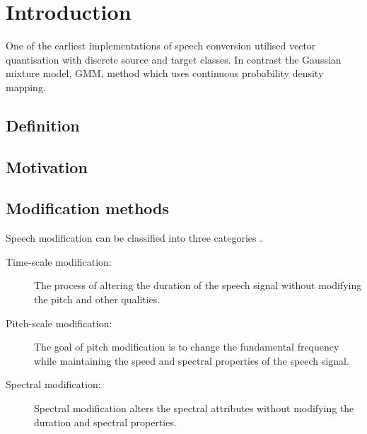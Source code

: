 \chapter{Introduction} %
\label{cha:introduction}
One of the earliest implementations of speech conversion utilised vector quantisation \cite{abe88} with discrete source and target classes. In contrast the Gaussian mixture model, GMM, method \cite{stylianou98} which uses continuous probability density mapping.

\section{Definition} %
\label{sec:definition}


\section{Motivation} %
\label{sec:motivation}


\section{Modification methods} %
\label{sec:synthesis_methods}
Speech modification can be classified into three categories \cite{nguyen09}.
\begin{description}
	\item[Time-scale modification: ] The process of altering the duration of the speech signal without modifying the pitch and other qualities.
	\item[Pitch-scale modification: ] The goal of pitch modification is to change the fundamental frequency while maintaining the speed and spectral properties of the speech signal.
	\item[Spectral modification: ] Spectral modification alters the spectral attributes without modifying the duration and spectral properties.
\end{description}

